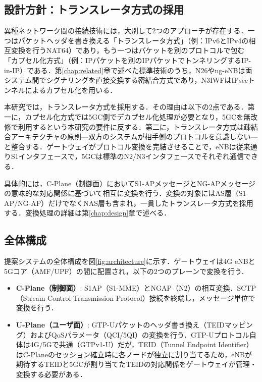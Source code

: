 \subsection{設計方針：トランスレータ方式の採用}
\label{subsec:design_policy}

異種ネットワーク間の接続技術には，大別して2つのアプローチが存在する．一つはパケットヘッダを書き換える「トランスレータ方式」（例：IPv6とIPv4の相互変換を行うNAT64\cite{rfc6146}）であり，もう一つはパケットを別のプロトコルで包む「カプセル化方式」（例：IPパケットを別のIPパケットでトンネリングするIP-in-IP\cite{rfc2003}）である．第\ref{chap:related}章で述べた標準技術のうち，N26やng-eNBは両システム間でシグナリングを直接交換する密結合方式であり，N3IWFはIPsecトンネルによるカプセル化を用いる．

本研究では，トランスレータ方式を採用する．その理由は以下の2点である．第一に，カプセル化方式では5GC側でデカプセル化処理が必要となり，5GCを無改修で利用するという本研究の要件に反する．第二に，トランスレータ方式は疎結合アーキテクチャの原則---双方のシステムが相手側のプロトコルを意識しない---と整合する．ゲートウェイがプロトコル変換を完結させることで，eNBは従来通りS1インタフェースで，5GCは標準のN2/N3インタフェースでそれぞれ通信できる．

具体的には，C-Plane（制御面）においてS1-APメッセージとNG-APメッセージの意味的な対応関係に基づいて相互に変換を行う．変換の対象にはAS層（S1-AP/NG-AP）だけでなくNAS層も含まれ，一貫したトランスレータ方式を採用する．変換処理の詳細は第\ref{chap:design}章で述べる．

\subsection{全体構成}
\label{subsec:overall_structure}

提案システムの全体構成を図\ref{fig:architecture}に示す．ゲートウェイは4G eNBと5Gコア（AMF/\allowbreak UPF）の間に配置され，以下の2つのプレーンで変換を行う．

\begin{itemize}
\item \textbf{C-Plane（制御面）}: S1AP（S1-MME）とNGAP（N2）の相互変換．SCTP（Stream Control Transmission Protocol）接続を終端し，メッセージ単位で変換を行う．
\item \textbf{U-Plane（ユーザ面）}: GTP-Uパケットのヘッダ書き換え（TEIDマッピング）およびQoSパラメータ（QCI/5QI）の変換を行う．GTP-Uプロトコル自体は4G/5Gで共通（GTPv1-U）だが，TEID（Tunnel Endpoint Identifier）はC-Planeのセッション確立時に各ノードが独立に割り当てるため，eNBが期待するTEIDと5GCが割り当てたTEIDの対応関係をゲートウェイが管理・変換する必要がある．
\end{itemize}

